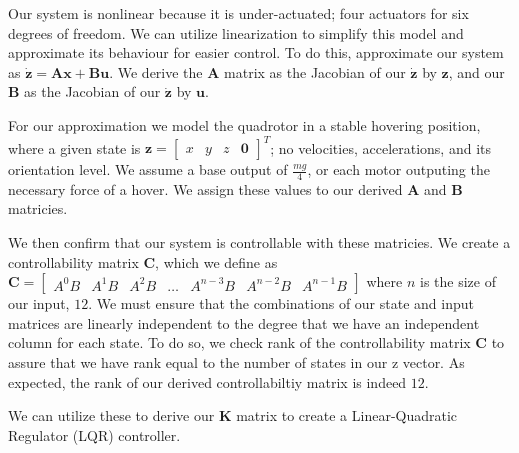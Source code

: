 \documentclass{article}
\begin{document}
\begin{multicols}{2}
Our system is nonlinear because it is under-actuated; four actuators for six degrees of freedom. We can utilize linearization to simplify this model and approximate its behaviour for easier control. To do this,  approximate our system as $\boldsymbol{\dot{z}}=\boldsymbol{A}\boldsymbol{x}+\boldsymbol{B}\boldsymbol{u}$. We derive the $\boldsymbol{A}$ matrix as the Jacobian of our $\boldsymbol{\dot{z}}$ by $\boldsymbol{z}$, and our $\boldsymbol{B}$ as the Jacobian of our $\boldsymbol{\dot{z}}$ by $\boldsymbol{u}$. 

For our approximation we model the quadrotor in a stable hovering position, where a given state is $\boldsymbol{z}=\begin{bmatrix} 
x & y & z & \boldsymbol{0}\end{bmatrix}^T$; no velocities, accelerations, and its orientation level. We assume a base output of $
\frac{mg}{4}$, or each motor outputing the necessary force of a hover. We assign these values to our derived $\boldsymbol{A}$ and 
$\boldsymbol{B}$ matricies.

We then confirm that our system is controllable with these matricies. We create a controllability matrix $\boldsymbol{C}$, 
which we define as $\boldsymbol{C} = \begin{bmatrix} A^0B & A^1B & A^2B & \dots & A^{n-3}B & A^{n-2}B & A^{n-1}B\end{bmatrix}$ 
where $n$ is the size of our input, $12$. We must ensure that the combinations of our state and input matrices are linearly 
independent to the degree that we have an independent column for each state. To do so, we check rank of the controllability matrix $
\boldsymbol{C}$ to assure that we have rank equal to the number of states in our z vector. As expected, the rank of our derived 
controllabiltiy matrix is indeed $12$.

We can utilize these to derive our $\boldsymbol{K}$ matrix to create a Linear-Quadratic Regulator (LQR) controller.


\end{multicols}
\end{document}
